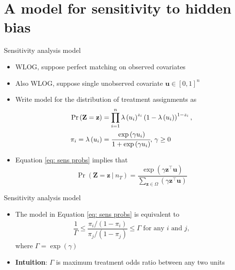 \documentclass[table, xcolor={dvipsnames}, 9pt]{beamer}
\newcommand\given[1][]{\:#1\vert\:}
\theoremstyle{newstyle}
\begin{document}
\section{A model for sensitivity to hidden bias}
\begin{frame}{Sensitivity analysis model}
\vfill
\begin{itemize}
\item WLOG, suppose perfect matching on observed covariates
\item Also WLOG, suppose single unobserved covariate $\bm{u} \in [0, 1]^n$ \\ \citep[][p. 300, footnote 33]{rosenbaum2017a}  \vfill
\item Write model for the distribution of treatment assignments as  \vfill
\begin{align} 
\Pr\left(\mathbf{Z} = \mathbf{z}\right) & = \prod \limits_{i = 1}^n \lambda\left(u_i\right)^{z_i} \left(1 - \lambda\left(u_i\right)\right)^{1 - z_i}, \\
\pi_i = \lambda\left(u_i\right) & = \cfrac{\exp\left(\gamma u_i\right)}{1 + \exp\left(\gamma u_i\right)}, \, \gamma \geq 0 \label{eq: sens probs}
\end{align} \vfill
\item  Equation \eqref{eq: sens probs} implies that \vfill
\begin{equation}
\Pr\left(\bm{Z} = \bm{z} \given n_T\right) = \dfrac{\exp\left(\gamma \bm{z}^{\top} \bm{u}\right)}{\sum \limits_{\bm{z} \in \Omega} (\gamma \bm{z}^{\top} \bm{u})}
\end{equation} \vfill
\end{itemize}
\end{frame}
\begin{frame}{Sensitivity analysis model}
\vfill
\begin{itemize} \vfill
\item The model in Equation \eqref{eq: sens probs} is equivalent to \vfill
\begin{align*}
\dfrac{1}{\Gamma} \leq \dfrac{\pi_i / (1 - \pi_i)}{\pi_j / (1 - \pi_j)} \leq \Gamma \text{ for any } i \text{ and } j,
\end{align*} \vfill
where $\Gamma = \exp(\gamma)$ \citep[see][]{rosenbaum1995a} \vfill
\item \textbf{Intuition}: $\Gamma$ is maximum treatment odds ratio between any two units \vfill
\end{itemize}
\end{frame}
\end{document}
